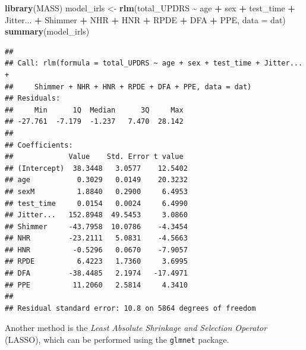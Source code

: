 \documentclass[
]{article}
\newenvironment{Shaded}{\begin{snugshade}}{\end{snugshade}}
\newcommand{\AttributeTok}[1]{\textcolor[rgb]{0.13,0.29,0.53}{#1}}
\newcommand{\FunctionTok}[1]{\textcolor[rgb]{0.13,0.29,0.53}{\textbf{#1}}}
\newcommand{\NormalTok}[1]{#1}
\newcommand{\OtherTok}[1]{\textcolor[rgb]{0.56,0.35,0.01}{#1}}
\newcommand{\SpecialCharTok}[1]{\textcolor[rgb]{0.81,0.36,0.00}{\textbf{#1}}}
\begin{document}
\begin{Shaded}
\begin{Highlighting}[]
\FunctionTok{library}\NormalTok{(MASS)}
\NormalTok{model\_irls }\OtherTok{\textless{}{-}} \FunctionTok{rlm}\NormalTok{(total\_UPDRS }\SpecialCharTok{\textasciitilde{}}\NormalTok{  age }\SpecialCharTok{+}\NormalTok{ sex }\SpecialCharTok{+}\NormalTok{ test\_time }\SpecialCharTok{+}
\NormalTok{             Jitter... }\SpecialCharTok{+}\NormalTok{ Shimmer }\SpecialCharTok{+}\NormalTok{ NHR }\SpecialCharTok{+}\NormalTok{ HNR }\SpecialCharTok{+}\NormalTok{ RPDE }\SpecialCharTok{+}\NormalTok{ DFA }\SpecialCharTok{+}\NormalTok{ PPE,}
           \AttributeTok{data =}\NormalTok{ dat)}
\FunctionTok{summary}\NormalTok{(model\_irls)}
\end{Highlighting}
\end{Shaded}

\begin{verbatim}
## 
## Call: rlm(formula = total_UPDRS ~ age + sex + test_time + Jitter... + 
##     Shimmer + NHR + HNR + RPDE + DFA + PPE, data = dat)
## Residuals:
##     Min      1Q  Median      3Q     Max 
## -27.761  -7.179  -1.237   7.470  28.142 
## 
## Coefficients:
##             Value    Std. Error t value 
## (Intercept)  38.3448   3.0577    12.5402
## age           0.3029   0.0149    20.3232
## sexM          1.8840   0.2900     6.4953
## test_time     0.0154   0.0024     6.4990
## Jitter...   152.8948  49.5453     3.0860
## Shimmer     -43.7958  10.0786    -4.3454
## NHR         -23.2111   5.0831    -4.5663
## HNR          -0.5296   0.0670    -7.9057
## RPDE          6.4223   1.7360     3.6995
## DFA         -38.4485   2.1974   -17.4971
## PPE          11.2060   2.5814     4.3410
## 
## Residual standard error: 10.8 on 5864 degrees of freedom
\end{verbatim}

Another method is the \emph{Least Absolute Shrinkage and Selection
Operator} (LASSO), which can be performed using the \texttt{glmnet}
package.
\end{document}
